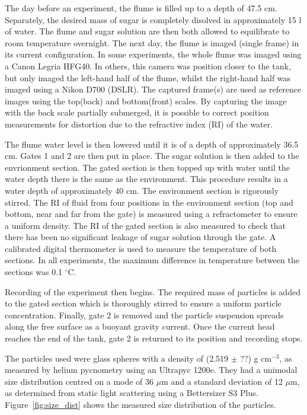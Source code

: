 \documentclass[authoryear,preprint,review,12pt]{elsarticle}
\begin{document}
The day before an experiment, the flume is filled up to a depth of 47.5 cm. Separately, the desired mass of sugar is completely disolved in approximately 15 l of water. The flume and sugar solution are then both allowed to equilibrate to room temperature overnight. The next day, the flume is imaged (single frame) in its current configuration. In some experiments, the whole flume was imaged using a Canon Legria HFG40. In others, this camera was position closer to the tank, but only imaged the left-hand half of the flume, whilst the right-hand half was imaged using a Nikon D700 (DSLR). The captured frame(s) are used as reference images using the top(back) and bottom(front) scales. By capturing the image with the back scale partially submerged, it is possible to correct position measurements for distortion due to the refractive index (RI) of the water.

The flume water level is then lowered until it is of a depth of approximately 36.5 cm. Gates 1 and 2 are then put in place. The sugar solution is then added to the envrionment section. The gated section is then topped up with water until the water depth there is the same as the environment. This procedure results in a water depth of approximately 40 cm. The environment section is rigorously stirred. The RI of fluid from four positions in the environment section (top and bottom, near and far from the gate) is measured using a refractometer to ensure a uniform density. The RI of the gated section is also measured to check that there has been no significant leakage of sugar solution through the gate. A calibrated digital thermometer is used to measure the temperature of both sections. In all experiments, the maximum difference in temperature between the sections was 0.1 $^{\circ}$C.

Recording of the experiment then begins. The required mass of particles is added to the gated section which is thoroughly stirred to ensure a uniform particle concentration. Finally, gate 2 is removed and the particle suspension spreads along the free surface as a buoyant gravity current. Once the current head reaches the end of the tank, gate 2 is returned to its position and recording stops. 

The particles used were glass spheres with a density of (2.519 $\pm$ ??) g cm$^{-3}$, as measured by helium pycnometry using an Ultrapyc 1200e. They had a unimodal size distribution centred on a mode of 36 $\mu$m and a standard deviation of 12 $\mu$m, as determined from static light scattering using a Bettersizer S3 Plus. Figure~\ref{fig:size_dist} shows the measured size distribution of the particles. 
\end{document}

